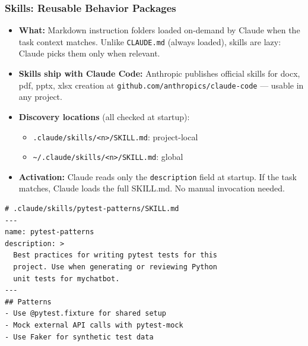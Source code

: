 \begin{frame}[fragile]\frametitle{Skills: Reusable Behavior Packages}
  \begin{itemize}
    \item \textbf{What:} Markdown instruction folders loaded on-demand by Claude when the task context matches. Unlike \texttt{CLAUDE.md} (always loaded), skills are lazy: Claude picks them only when relevant.
    \item \textbf{Skills ship with Claude Code:} Anthropic publishes official skills for docx, pdf, pptx, xlsx creation at \texttt{github.com/anthropics/claude-code} --- usable in any project.
    \item \textbf{Discovery locations} (all checked at startup):
      \begin{itemize}
        \item \texttt{.claude/skills/<n>/SKILL.md}: project-local
        \item \texttt{\textasciitilde/.claude/skills/<n>/SKILL.md}: global
      \end{itemize}
    \item \textbf{Activation:} Claude reads only the \texttt{description} field at startup. If the task matches, Claude loads the full SKILL.md. No manual invocation needed.
  \end{itemize}

\begin{lstlisting}
# .claude/skills/pytest-patterns/SKILL.md
---
name: pytest-patterns
description: >
  Best practices for writing pytest tests for this
  project. Use when generating or reviewing Python
  unit tests for mychatbot.
---
## Patterns
- Use @pytest.fixture for shared setup
- Mock external API calls with pytest-mock
- Use Faker for synthetic test data
\end{lstlisting}
\end{frame}


